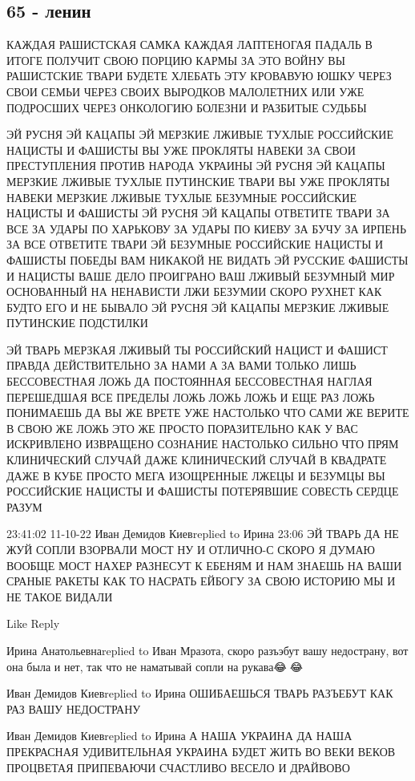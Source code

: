 \subsection{65 - ленин}

КАЖДАЯ РАШИСТСКАЯ САМКА
КАЖДАЯ ЛАПТЕНОГАЯ ПАДАЛЬ
В ИТОГЕ ПОЛУЧИТ СВОЮ ПОРЦИЮ КАРМЫ ЗА ЭТО ВОЙНУ
ВЫ РАШИСТСКИЕ ТВАРИ БУДЕТЕ ХЛЕБАТЬ
ЭТУ КРОВАВУЮ ЮШКУ
ЧЕРЕЗ СВОИ СЕМЬИ
ЧЕРЕЗ СВОИХ ВЫРОДКОВ
МАЛОЛЕТНИХ ИЛИ УЖЕ ПОДРОСШИХ
ЧЕРЕЗ ОНКОЛОГИЮ
БОЛЕЗНИ И РАЗБИТЫЕ СУДЬБЫ

ЭЙ РУСНЯ ЭЙ КАЦАПЫ ЭЙ МЕРЗКИЕ ЛЖИВЫЕ ТУХЛЫЕ РОССИЙСКИЕ НАЦИСТЫ И ФАШИСТЫ ВЫ УЖЕ
ПРОКЛЯТЫ НАВЕКИ ЗА СВОИ ПРЕСТУПЛЕНИЯ ПРОТИВ НАРОДА УКРАИНЫ ЭЙ РУСНЯ ЭЙ КАЦАПЫ
МЕРЗКИЕ ЛЖИВЫЕ ТУХЛЫЕ ПУТИНСКИЕ ТВАРИ ВЫ УЖЕ ПРОКЛЯТЫ НАВЕКИ МЕРЗКИЕ ЛЖИВЫЕ
ТУХЛЫЕ БЕЗУМНЫЕ РОССИЙСКИЕ НАЦИСТЫ И ФАШИСТЫ ЭЙ РУСНЯ ЭЙ КАЦАПЫ ОТВЕТИТЕ ТВАРИ
ЗА ВСЕ ЗА УДАРЫ ПО ХАРЬКОВУ ЗА УДАРЫ ПО КИЕВУ ЗА БУЧУ ЗА ИРПЕНЬ ЗА ВСЕ ОТВЕТИТЕ
ТВАРИ ЭЙ БЕЗУМНЫЕ РОССИЙСКИЕ НАЦИСТЫ И ФАШИСТЫ ПОБЕДЫ ВАМ НИКАКОЙ НЕ ВИДАТЬ ЭЙ
РУССКИЕ ФАШИСТЫ И НАЦИСТЫ ВАШЕ ДЕЛО ПРОИГРАНО ВАШ ЛЖИВЫЙ БЕЗУМНЫЙ МИР
ОСНОВАННЫЙ НА НЕНАВИСТИ ЛЖИ БЕЗУМИИ СКОРО РУХНЕТ КАК БУДТО ЕГО И НЕ БЫВАЛО ЭЙ
РУСНЯ ЭЙ КАЦАПЫ МЕРЗКИЕ ЛЖИВЫЕ ПУТИНСКИЕ ПОДСТИЛКИ 

ЭЙ ТВАРЬ МЕРЗКАЯ ЛЖИВЫЙ ТЫ РОССИЙСКИЙ НАЦИСТ И ФАШИСТ ПРАВДА ДЕЙСТВИТЕЛЬНО ЗА
НАМИ А ЗА ВАМИ ТОЛЬКО ЛИШЬ БЕССОВЕСТНАЯ ЛОЖЬ ДА ПОСТОЯННАЯ БЕССОВЕСТНАЯ НАГЛАЯ
ПЕРЕШЕДШАЯ ВСЕ ПРЕДЕЛЫ ЛОЖЬ ЛОЖЬ ЛОЖЬ И ЕЩЕ РАЗ ЛОЖЬ ПОНИМАЕШЬ ДА ВЫ ЖЕ ВРЕТЕ
УЖЕ НАСТОЛЬКО ЧТО САМИ ЖЕ ВЕРИТЕ В СВОЮ ЖЕ ЛОЖЬ ЭТО ЖЕ ПРОСТО ПОРАЗИТЕЛЬНО КАК
У ВАС ИСКРИВЛЕНО ИЗВРАЩЕНО СОЗНАНИЕ НАСТОЛЬКО СИЛЬНО ЧТО ПРЯМ КЛИНИЧЕСКИЙ
СЛУЧАЙ ДАЖЕ КЛИНИЧЕСКИЙ СЛУЧАЙ В КВАДРАТЕ ДАЖЕ В КУБЕ ПРОСТО МЕГА ИЗОЩРЕННЫЕ
ЛЖЕЦЫ И БЕЗУМЦЫ ВЫ РОССИЙСКИЕ НАЦИСТЫ И ФАШИСТЫ ПОТЕРЯВШИЕ СОВЕСТЬ СЕРДЦЕ РАЗУМ

23:41:02 11-10-22
Иван Демидов Киевreplied to Ирина
23:06
ЭЙ ТВАРЬ ДА НЕ ЖУЙ СОПЛИ ВЗОРВАЛИ МОСТ НУ И ОТЛИЧНО-С СКОРО Я ДУМАЮ ВООБЩЕ МОСТ НАХЕР РАЗНЕСУТ К ЕБЕНЯМ И НАМ ЗНАЕШЬ НА ВАШИ СРАНЫЕ РАКЕТЫ КАК ТО НАСРАТЬ ЕЙБОГУ ЗА СВОЮ ИСТОРИЮ МЫ И НЕ ТАКОЕ ВИДАЛИ

    Like
    Reply

Ирина Анатольевнаreplied to Иван
Мразота, скоро разъэбут вашу недострану, вот она была и нет, так что не наматывай сопли на рукава😂🤣😂

Иван Демидов Киевreplied to Ирина
ОШИБАЕШЬСЯ ТВАРЬ РАЗЪЕБУТ КАК РАЗ ВАШУ НЕДОСТРАНУ

Иван Демидов Киевreplied to Ирина
А НАША УКРАИНА ДА НАША ПРЕКРАСНАЯ УДИВИТЕЛЬНАЯ УКРАИНА БУДЕТ ЖИТЬ ВО ВЕКИ ВЕКОВ ПРОЦВЕТАЯ ПРИПЕВАЮЧИ СЧАСТЛИВО ВЕСЕЛО И ДРАЙВОВО


